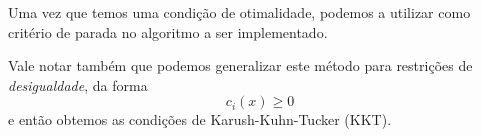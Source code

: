     Uma vez que temos uma condição de otimalidade, podemos a utilizar como critério
    de parada no algoritmo a ser implementado.

    Vale notar também que podemos generalizar este método para restrições de \emph{desigualdade},
    da forma
    $$ c_i(x) \geq 0 $$
    e então obtemos as condições de Karush-Kuhn-Tucker (KKT). \citep{Nocedal2006NO}
